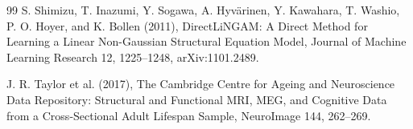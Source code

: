 \documentclass{article}
\begin{document}
\begin{thebibliography}{99}
   S. Shimizu, T. Inazumi, Y. Sogawa, A. Hyv\"arinen, Y. Kawahara, T. Washio, P. O. Hoyer, and K. Bollen (2011), DirectLiNGAM: A Direct Method for Learning a Linear Non-Gaussian Structural Equation Model, Journal of Machine Learning Research 12, 1225--1248, arXiv:1101.2489.

   J. R. Taylor et al. (2017), The Cambridge Centre for Ageing and Neuroscience Data Repository: Structural and Functional MRI, MEG, and Cognitive Data from a Cross-Sectional Adult Lifespan Sample, NeuroImage 144, 262--269.

\end{thebibliography}
\end{document}
